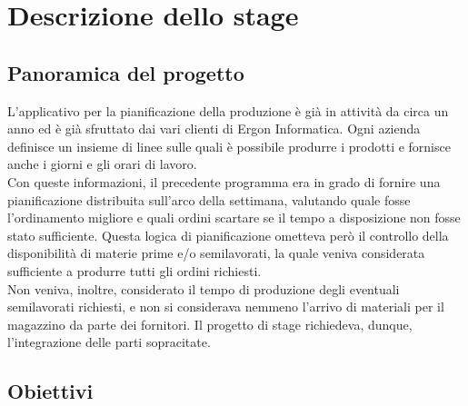 
\chapter{Descrizione dello stage}
\label{cap:Descrizione-dello-stage}

\section{Panoramica del progetto}
L'applicativo per la pianificazione della produzione è già in attività da circa un anno ed è già sfruttato dai vari clienti di Ergon Informatica. Ogni azienda definisce un insieme di linee sulle quali è possibile produrre i prodotti e fornisce anche i giorni e gli orari di lavoro.
\\Con queste informazioni, il precedente programma era in grado di fornire una pianificazione distribuita sull'arco della settimana, valutando quale fosse l'ordinamento migliore e quali ordini scartare se il tempo a disposizione non fosse stato sufficiente. Questa logica di pianificazione ometteva però il controllo della disponibilità di materie prime e/o semilavorati,
 la quale veniva considerata sufficiente a produrre tutti gli ordini richiesti.\\ Non veniva, inoltre, considerato il tempo di produzione degli eventuali semilavorati richiesti, e non si considerava nemmeno l'arrivo di materiali per il magazzino da parte dei fornitori.
Il progetto di stage richiedeva, dunque, l'integrazione delle parti sopracitate.

\newpage
\section{Obiettivi}

